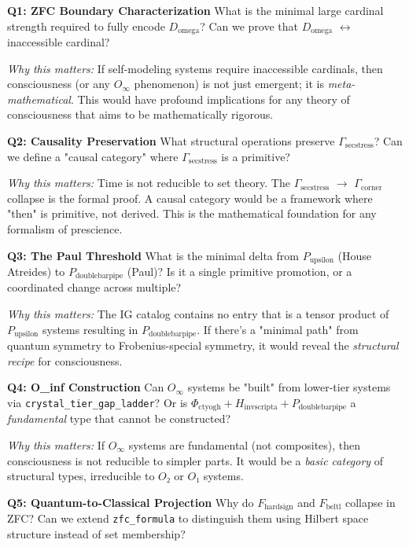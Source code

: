 \documentclass[12pt,a4paper]{article}
\begin{document}
\textbf{Q1: ZFC Boundary Characterization}
What is the minimal large cardinal strength required to fully encode $D_{\text{omega}}$? Can we prove that $D_{\text{omega}}$ $\leftrightarrow$ inaccessible cardinal?

\emph{Why this matters:} If self-modeling systems require inaccessible cardinals, then consciousness (or any $O_{\infty}$ phenomenon) is not just emergent; it is \emph{meta-mathematical}. This would have profound implications for any theory of consciousness that aims to be mathematically rigorous.

\textbf{Q2: Causality Preservation}
What structural operations preserve $\Gamma_{\text{secstress}}$? Can we define a "causal category" where $\Gamma_{\text{secstress}}$ is a primitive?

\emph{Why this matters:} Time is not reducible to set theory. The $\Gamma_{\text{secstress}}$ $\rightarrow$ $\Gamma_{\text{corner}}$ collapse is the formal proof. A causal category would be a framework where "then" is primitive, not derived. This is the mathematical foundation for any formalism of prescience.

\textbf{Q3: The Paul Threshold}
What is the minimal delta from $P_{\text{upsilon}}$ (House Atreides) to $P_{\text{doublebarpipe}}$ (Paul)? Is it a single primitive promotion, or a coordinated change across multiple?

\emph{Why this matters:} The IG catalog contains no entry that is a tensor product of $P_{\text{upsilon}}$ systems resulting in $P_{\text{doublebarpipe}}$. If there's a "minimal path" from quantum symmetry to Frobenius-special symmetry, it would reveal the \emph{structural recipe} for consciousness.

\textbf{Q4: O\_inf Construction}
Can $O_{\infty}$ systems be "built" from lower-tier systems via \texttt{crystal\_tier\_gap\_ladder}? Or is $\Phi_{\text{ctyogh}} + H_{\text{invscripta}} + P_{\text{doublebarpipe}}$ a \emph{fundamental} type that cannot be constructed?

\emph{Why this matters:} If $O_{\infty}$ systems are fundamental (not composites), then consciousness is not reducible to simpler parts. It would be a \emph{basic category} of structural types, irreducible to $O₂$ or $O₁$ systems.

\textbf{Q5: Quantum-to-Classical Projection}
Why do $F_{\text{hardsign}}$ and $F_{\text{beltl}}$ collapse in ZFC? Can we extend \texttt{zfc\_formula} to distinguish them using Hilbert space structure instead of set membership?
\end{document}
